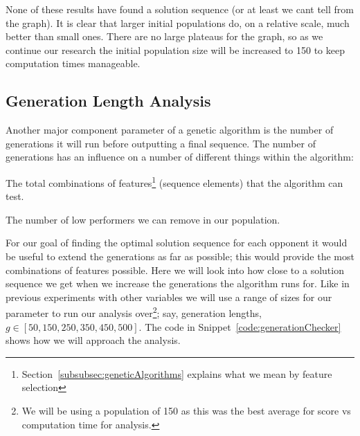 None of these results have found a solution sequence (or at least we cant tell from the graph).
It is clear that larger initial populations do, on a relative scale, much better than small ones.
There are no large plateaus for the graph, so as we continue our research the initial population size will be increased to 150 to keep computation times manageable.\\


\subsection{Generation Length Analysis}\label{subsec:generationLengthAnalysis}
Another major component parameter of a genetic algorithm is the number of generations it will run before outputting a final sequence.
The number of generations has an influence on a number of different things within the algorithm:
\begin{itemize}
    \begin{item}
        The total combinations of features\footnote{Section~\ref{subsubsec:geneticAlgorithms} explains what we mean by feature selection}
        (sequence elements) that the algorithm can test.
    \end{item}
    \begin{item}
        The number of low performers we can remove in our population.
    \end{item}
\end{itemize}

For our goal of finding the optimal solution sequence for each opponent it would be useful to extend the generations as far as possible;
this would provide the most combinations of features possible.
Here we will look into how close to a solution sequence we get when we increase the generations the algorithm runs for.
Like in previous experiments with other variables we will use a range of sizes for our parameter to run our analysis
over\footnote{We will be using a population of 150 as this was the best average for score vs computation time for analysis.}; say, generation lengths, \(g \in [50,150,250,350,450,500]\).
The code in Snippet~\ref{code:generationChecker} shows how we will approach the analysis.\\

